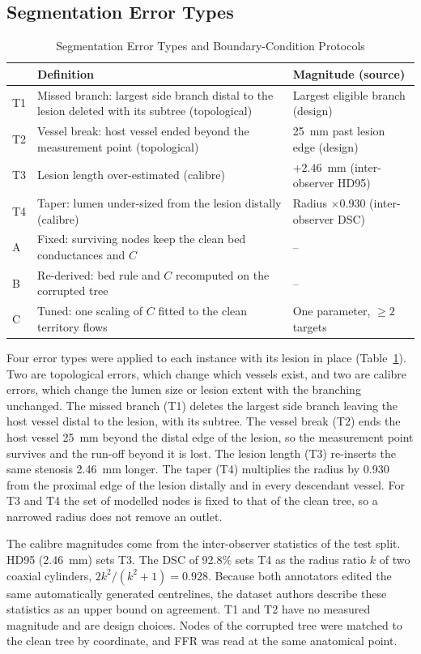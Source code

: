 \documentclass[journal]{IEEEtran}
\begin{document}
\subsection{Segmentation Error Types}
\begin{table}[!t]
\caption{Segmentation Error Types and Boundary-Condition Protocols}
\label{tab:design}
\centering\footnotesize
\begin{tabular}{@{}p{0.9cm}p{4.0cm}p{2.3cm}@{}}
\toprule
 & Definition & Magnitude (source)\\
\midrule
T1 & Missed branch: largest side branch distal to the lesion deleted with its subtree (topological) & Largest eligible branch (design)\\
T2 & Vessel break: host vessel ended beyond the measurement point (topological) & 25~mm past lesion edge (design)\\
T3 & Lesion length over-estimated (calibre) & $+2.46$~mm (inter-observer HD95)\\
T4 & Taper: lumen under-sized from the lesion distally (calibre) & Radius $\times 0.930$ (inter-observer DSC)\\
\midrule
A & Fixed: surviving nodes keep the clean bed conductances and $C$ & --\\
B & Re-derived: bed rule and $C$ recomputed on the corrupted tree & --\\
C & Tuned: one scaling of $C$ fitted to the clean territory flows & One parameter, $\geq 2$ targets\\
\bottomrule
\end{tabular}
\end{table}
Four error types were applied to each instance with its lesion in place (Table~\ref{tab:design}). Two are
topological errors, which change which vessels exist, and two are calibre errors, which change the lumen size or
lesion extent with the branching unchanged. The missed branch (T1) deletes the largest side branch leaving the host
vessel distal to the lesion, with its subtree. The vessel break (T2) ends the host vessel 25~mm beyond the distal
edge of the lesion, so the measurement point survives and the run-off beyond it is lost. The lesion length (T3)
re-inserts the same stenosis 2.46~mm longer. The taper (T4) multiplies the radius by 0.930 from the proximal edge of
the lesion distally and in every descendant vessel. For T3 and T4 the set of modelled nodes is fixed to that of the
clean tree, so a narrowed radius does not remove an outlet.

The calibre magnitudes come from the inter-observer statistics of the test split. HD95 (2.46~mm) sets T3. The DSC of
92.8\% sets T4 as the radius ratio $k$ of two coaxial cylinders, $2k^2/(k^2+1) = 0.928$. Because both annotators
edited the same automatically generated centrelines, the dataset authors describe these statistics as an upper
bound on agreement. T1 and T2 have no measured magnitude and are design choices. Nodes of the corrupted tree were
matched to the clean tree by coordinate, and FFR was read at the same anatomical point.
\end{document}
